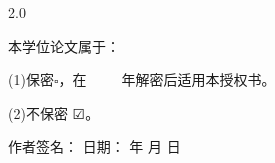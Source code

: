 {{\begin{spacing}{2.0}
{		本学位论文属于：
		
		(1)保密$\square$，在~~~~~年解密后适用本授权书。
		
		(2)不保密 $\CheckedBox$。}%
        \end{spacing}

        \vspace{10pt}
        \vspace{10pt}
		\vspace{10pt}
        \vspace{10pt}
        \vspace{10pt}
		\vspace{10pt}
		\vspace{10pt}
        \vspace{10pt}
		\vspace{10pt}
        \begin{center}
            {\songti {}作者签名：\makebox[5em][c]{} \quad %
            日期：
            \makebox[3em][c]{} 年
            \makebox[1.5em][c]{} 月
            \makebox[1.5em][c]{} 日}
        \end{center}
    }
}